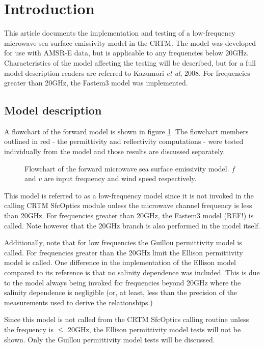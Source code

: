 \section{Introduction}
This article documents the implementation and testing of a low-frequency microwave sea surface emissivity model in the CRTM. The model was developed for use with AMSR-E data, but is applicable to any frequencies below 20GHz. Characteristics of the model affecting the testing will be described, but for a full model description readers are referred to Kazumori \textit{et al}, 2008\cite{Kazumori_etal_2008}. For frequencies greater than 20GHz, the Fastem3 model was implemented.

\subsection{Model description}
\label{sec:model_description}
A flowchart of the forward model is shown in figure \ref{fig:main_flowchart}. The flowchart members outlined in red - the permittivity and reflectivity computations - were tested individually from the model and those results are discussed separately.
\begin{figure}[htp]
  \centering
  
  \caption{Flowchart of the forward microwave sea surface emissivity model. $f$ and $v$ are input frequency and wind speed respectively.}
  \label{fig:main_flowchart}
\end{figure}
This model is referred to as a low-frequency model since it is not invoked in the calling CRTM SfcOptics module unless the microwave channel frequency is less than 20GHz. For frequencies greater than 20GHz, the Fastem3 model (REF!) is called. Note however that the 20GHz branch is also performed in the model itself.

Additionally, note that for low frequencies the Guillou permittivity model \cite{Guillou_etal_1998} is called. For frequencies greater than the 20GHz limit the Ellison permittivity model \cite{Ellison_etal_2003} is called. One difference in the implementation of the Ellison model compared to its reference is that no salinity dependence was included. This is due to the model always being invoked for frequencies beyond 20GHz where the salinity dependence is negligible (or, at least, less than the precision of the measurements used to derive the relationships.)

Since this model is not called from the CRTM SfcOptics calling routine unless the frequency is $\le$ 20GHz, the Ellison permittivity model tests will not be shown. Only the Guillou permittivity model tests will be discussed.

